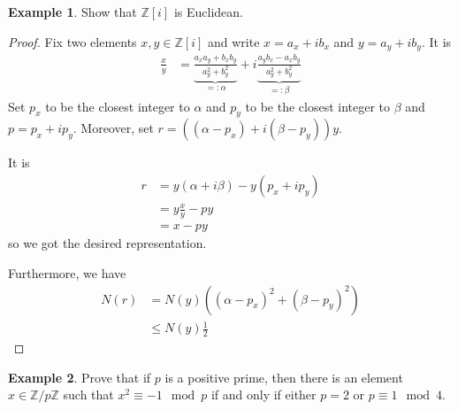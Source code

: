 \documentclass[a4paper]{book}
\theoremstyle{definition}
\newtheorem{example}{Example}[definition]
\begin{document}
\begin{example}
    Show that \(\mathbb{Z}[i]\) is Euclidean.
\end{example}
\begin{proof}
    Fix two elements \(x, y \in \mathbb{Z}[i]\) and write \(x = a_x + i b_x\) and \(y = a_y + i b_y\). It is
    \begin{align*}
        \frac{x}{y} &= \underbrace{\frac{a_x a_y + b_x b_y}{a_y^2 + b_y^2}}_{=: \alpha} + i \underbrace{\frac{a_y b_x - a_x b_y}{a_y^2 + b_y^2}}_{=: \beta}
    \end{align*}
    Set \(p_x\) to be the closest integer to \(\alpha\) and \(p_y\) to be the closest integer to \(\beta\) and \(p = p_x + i p_y\). Moreover, set \(r = ((\alpha - p_x) + i (\beta - p_y)) y\).

    It is
    \begin{align*}
        r &= y(\alpha + i \beta) - y (p_x + i p_y) \\
        &= y \frac{x}{y} - py \\
        &= x - py
    \end{align*}
    so we got the desired representation.

    Furthermore, we have
    \begin{align*}
        N(r) &= N(y) ((\alpha - p_x)^2 + (\beta - p_y)^2)\\
        &\leq N(y) \frac{1}{2}
    \end{align*}
\end{proof}
\begin{example}
    Prove that if \(p\) is a positive prime, then there is an element \(x \in \mathbb{Z}/p\mathbb{Z}\) such that \(x^2 \equiv -1 \mod{p}\) if and only if either \(p = 2\) or \(p \equiv 1 \mod{4}\).
\end{example}
\end{document}

